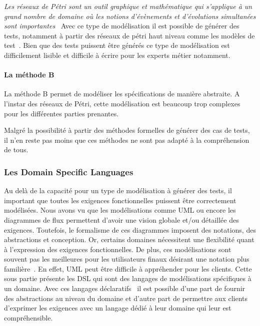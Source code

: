         \textit{\guillemotleft Les réseaux de Pétri sont un outil graphique et mathématique qui s’applique à un grand nombre de domaine où les notions d’évènements et d’évolutions simultanées sont importantes\guillemotright}~\cite{article14} Avec ce type de modélisation il est possible de générer des tests, notamment à partir des réseaux de pétri haut niveau comme les modèles de test~\cite{article15}. Bien que des tests puissent être générés ce type de modélisation est difficilement lisible et difficile à écrire pour les experts métier notamment. 
        
        \paragraph{La méthode B}
        
        La méthode B permet de modéliser les spécifications de manière  abstraite. A l'instar des réseaux de Pétri, cette modélisation est beaucoup trop complexes pour les différentes parties prenantes.
        
        Malgré la possibilité à partir des méthodes formelles de générer des cas de tests, il n'en reste pas moins que ces méthodes ne sont pas adapté à la compréhension de tous.
    
        \subsubsection{Les Domain Specific Languages}

        Au delà de la capacité pour un type de modélisation à générer des tests, il important que toutes les exigences fonctionnelles puissent être correctement modélisées. Nous avons vu que les modélisations comme UML ou encore les diagrammes de flux permettent d'avoir une vision globale et/ou détaillée des exigences. Toutefois, le formalisme de ces diagrammes imposent des notations, des abstractions et conception. Or, certains domaines nécessitent une flexibilité quant à l'expression des exigences fonctionnelles. De plus, ces modélisations sont souvent pas les meilleures pour les utilisateurs finaux désirant une notation plus familière~\cite{article3}. En effet, UML peut être difficile à appréhender pour les clients. Cette sous partie présente les DSL qui sont des langages de modélisations spécifiques à un domaine. Avec ces langages déclaratifs~\cite{article4} il est possible d'une part de fournir des abstractions au niveau du domaine et d'autre part de permettre aux clients d'exprimer les exigences avec un langage dédié à leur domaine qui leur est compréhensible.
    
